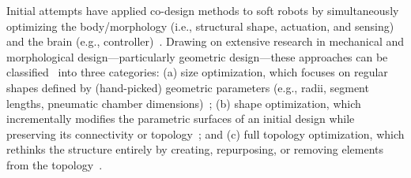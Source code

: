 Initial attempts have applied co-design methods to soft robots by simultaneously optimizing the body/morphology (i.e., structural shape, actuation, and sensing) and the brain (e.g., controller)~\citep{spielberg2019learning, cianchetti2021embodied, bhatia2021evolution, van2022co, wang2022curriculum, wang2023preco, navez2024contributions, wang2024diffusebot, junge2022leveraging}. Drawing on extensive research in mechanical and morphological design—particularly geometric design—these approaches can be classified~\citep{chen2020design} into three categories: (a) size optimization, which focuses on regular shapes defined by (hand-picked) geometric parameters (e.g., radii, segment lengths, pneumatic chamber dimensions)~\citep{dammer2018design, wang2018programmable, guan2023trimmed, calisti2011octopus, pagliarani2024variable, polygerinos2015modeling, navez2024design, junge2022leveraging}; (b) shape optimization, which incrementally modifies the parametric surfaces of an initial design while preserving its connectivity or topology~\citep{siefert2019bio}; and (c) full topology optimization, which rethinks the structure entirely by creating, repurposing, or removing elements from the topology~\citep{sigmund2013topology, jewett2019topology, zhang2018topology, caasenbrood2020computational, spielberg2019learning, wang2022curriculum, legrand2023reconfigurable, wang2023softzoo, wang2023preco, wang2024diffusebot, pinskier2024diversity}.

